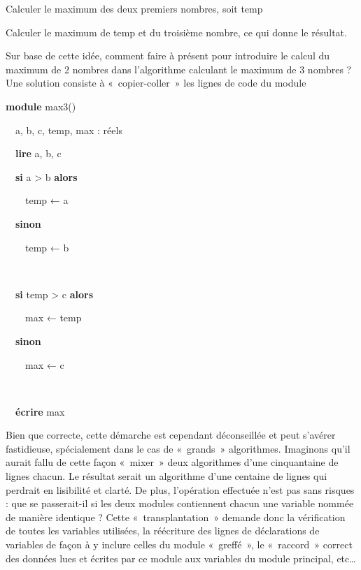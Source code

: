 {\sffamily
Calculer le maximum des deux premiers nombres, soit temp}

{\sffamily
Calculer le maximum de temp et du troisième nombre, ce qui donne le
résultat.}

{
{Sur base de cette idée, comment faire à présent
pour introduire le calcul du maximum de 2 nombres dans l’algorithme
calculant le maximum de 3 nombres ? Une solution consiste à
«~copier-coller~» les lignes de code du module
}}

{\sffamily
\textbf{module} max3()}

{\sffamily
\ \ a, b, c, temp, max : réels}

{\sffamily
\ \ \textbf{lire} a, b, c}

{\sffamily
\ \ \textbf{si} a {\textgreater} b \textbf{alors}}

{\sffamily
\ \ \ \ temp{ }{← a}}

{\sffamily
\ \ \textbf{sinon}}

{\sffamily
\ \ \ \ temp{ }{← b}}

{\sffamily
\ \  }

{\sffamily
\ \ \textbf{si} temp {\textgreater} c \textbf{alors}}

{\sffamily
\ \ \ \ max{ }{← temp}}

{\sffamily
\ \ \textbf{sinon}}

{\sffamily
\ \ \ \ max{ }{← c}}

{\sffamily
\ \  }

{\sffamily
\ \ \textbf{écrire} max}

{\sffamily
{}}

{
Bien que correcte, cette démarche est cependant déconseillée et peut
s’avérer fastidieuse, spécialement dans le cas de «~grands~»
algorithmes. Imaginons qu’il aurait fallu de cette façon «~mixer~» deux
algorithmes d’une cinquantaine de lignes chacun. Le résultat serait un
algorithme d’une centaine de lignes qui perdrait en lisibilité et
clarté. De plus, l’opération effectuée n’est pas sans risques : que se
passerait-il si les deux modules contiennent chacun une variable nommée
de manière identique ? Cette «~transplantation~» demande donc la
vérification de toutes les variables utilisées, la réécriture des
lignes de déclarations de variables de façon à y inclure celles du
module «~greffé~», le «~raccord~» correct des données lues et écrites
par ce module aux variables du module principal, etc… }

